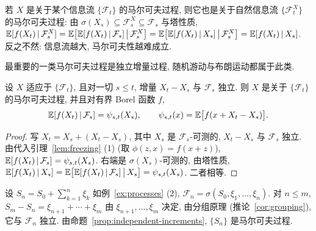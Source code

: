 \begin{remark}
若 $X$ 是关于某个信息流 $\{\mathcal{F}_t\}$ 的马尔可夫过程, 则它也是关于自然信息流 $\{\mathcal{F}^X_t\}$ 的马尔可夫过程: 由 $\sigma(X_s)\subseteq\mathcal{F}^X_s\subseteq\mathcal{F}_s$ 与塔性质,
$\mathbb{E}[f(X_t)\,|\,\mathcal{F}^X_s]=\mathbb{E}\big[\mathbb{E}[f(X_t)\,|\,\mathcal{F}_s]\,\big|\,\mathcal{F}^X_s\big]=\mathbb{E}\big[\mathbb{E}[f(X_t)\,|\,X_s]\,\big|\,\mathcal{F}^X_s\big]=\mathbb{E}[f(X_t)\,|\,X_s]$. 反之不然: 信息流越大, 马尔可夫性越难成立.
\end{remark}

最重要的一类马尔可夫过程是独立增量过程, 随机游动与布朗运动都属于此类.

\begin{proposition}[独立增量过程是马尔可夫过程]\label{prop:independent-increments}
设 $X$ 适应于 $\{\mathcal{F}_t\}$, 且对一切 $s\le t$, 增量 $X_t-X_s$ 与 $\mathcal{F}_s$ 独立. 则 $X$ 是关于 $\{\mathcal{F}_t\}$ 的马尔可夫过程, 并且对有界 Borel 函数 $f$,
\[
\mathbb{E}[f(X_t)\,|\,\mathcal{F}_s]=\psi_{s,t}(X_s),\qquad \psi_{s,t}(x)=\mathbb{E}\big[f(x+X_t-X_s)\big].
\]
\end{proposition}

\begin{proof}
写 $X_t=X_s+(X_t-X_s)$, 其中 $X_s$ 是 $\mathcal{F}_s$-可测的, $X_t-X_s$ 与 $\mathcal{F}_s$ 独立. 由代入引理~\ref{lem:freezing} (1) (取 $\phi(z,x)=f(x+z)$), $\mathbb{E}[f(X_t)\,|\,\mathcal{F}_s]=\psi_{s,t}(X_s)$. 右端是 $\sigma(X_s)$-可测的, 由塔性质, $\mathbb{E}[f(X_t)\,|\,X_s]=\mathbb{E}\big[\mathbb{E}[f(X_t)\,|\,\mathcal{F}_s]\,\big|\,X_s\big]=\psi_{s,t}(X_s)$. 二者相等.
\end{proof}

\begin{example}[随机游动的马尔可夫性]\label{ex:rw-markov}
设 $S_n=S_0+\sum_{k=1}^n\xi_k$ 如例~\ref{ex:processes} (2), $\mathcal{F}_n=\sigma(S_0,\xi_1,\dots,\xi_n)$. 对 $n\le m$, $S_m-S_n=\xi_{n+1}+\cdots+\xi_m$ 由 $\xi_{n+1},\dots,\xi_m$ 决定, 由分组原理 (推论~\ref{cor:grouping}), 它与 $\mathcal{F}_n$ 独立. 由命题~\ref{prop:independent-increments}, $\{S_n\}$ 是马尔可夫过程.
\end{example}

